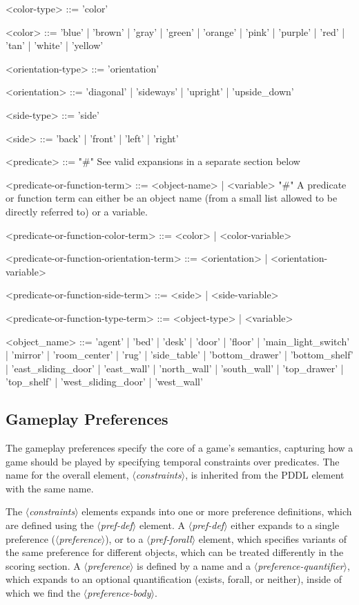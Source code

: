\documentclass{article}
\newcommand{\dsl}[1]{{\it $\langle$#1$\rangle$}}
\begin{document}
\begin{grammar}
<color-type> ::= 'color'

<color> ::= 'blue' | 'brown' | 'gray' | 'green' | 'orange' | 'pink' | 'purple' | 'red' | 'tan' | 'white' | 'yellow'

<orientation-type> ::= 'orientation'

<orientation> ::= 'diagonal' | 'sideways' | 'upright' | 'upside_down'

<side-type> ::= 'side'

<side> ::= 'back' | 'front' | 'left' | 'right'

<predicate> ::= "#" See valid expansions in a separate section below

<predicate-or-function-term> ::= <object-name> | <variable> "#" A predicate or function term can either be an object name (from a small list allowed to be directly referred to) or a variable.

<predicate-or-function-color-term> ::= <color> | <color-variable>

<predicate-or-function-orientation-term> ::= <orientation> | <orientation-variable>

<predicate-or-function-side-term> ::= <side> | <side-variable>

<predicate-or-function-type-term> ::= <object-type> | <variable>

<object_name> ::= 'agent' | 'bed' | 'desk' | 'door' | 'floor' | 'main_light_switch' | 'mirror' | 'room_center' | 'rug' | 'side_table' | 'bottom_drawer' | 'bottom_shelf' | 'east_sliding_door' | 'east_wall' | 'north_wall' | 'south_wall' | 'top_drawer' | 'top_shelf' | 'west_sliding_door' | 'west_wall'



\end{grammar}



\subsection{Gameplay Preferences} \label{sec:constraints}
The gameplay preferences specify the core of a game's semantics, capturing how a game should be played by specifying temporal constraints over predicates.
The name for the overall element, \dsl{constraints}, is inherited from the PDDL element with the same name.

The \dsl{constraints} elements expands into one or more preference definitions, which are defined using the \dsl{pref-def} element.
A \dsl{pref-def} either expands to a single preference (\dsl{preference}), or to a \dsl{pref-forall} element, which specifies variants of the same preference for different objects, which can be treated differently in the scoring section.
A \dsl{preference} is defined by a name and a \dsl{preference-quantifier}, which expands to an optional quantification (exists, forall, or neither), inside of which we find the \dsl{preference-body}.
\end{document}
